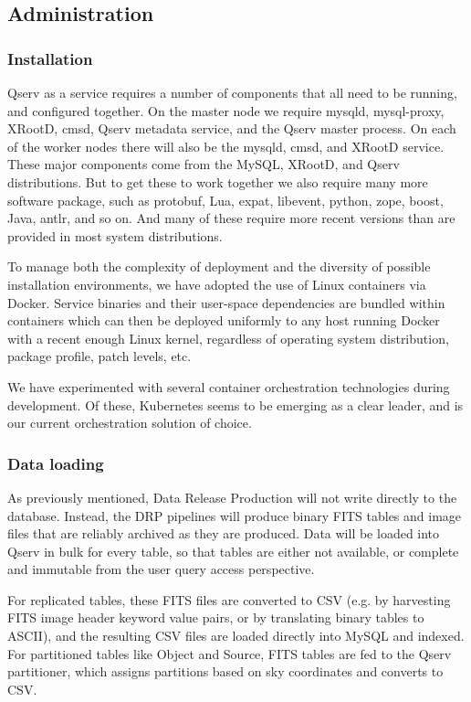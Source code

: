 \documentclass[DM,toc]{lsstdoc}
\begin{document}
\subsection{Administration}\label{administration}

\subsubsection{Installation}\label{installation}

Qserv as a service requires a number of components that all need to be
running, and configured together. On the master node we require mysqld, mysql-proxy,
XRootD, cmsd, Qserv metadata service, and the Qserv master process. On
each of the worker nodes there will also be the mysqld, cmsd, and XRootD
service. These major components come from the MySQL, XRootD, and Qserv
distributions. But to get these to work together we also require many more
software package, such as protobuf, Lua, expat, libevent, python, zope, boost,
Java, antlr, and so on. And many of these require more recent versions than
are provided in most system distributions.

To manage both the complexity of deployment and the diversity of possible
installation environments, we have adopted the use of Linux containers via
Docker.  Service binaries and their user-space dependencies are bundled within
containers which can then be deployed uniformly to any host running Docker
with a recent enough Linux kernel, regardless of operating system
distribution, package profile, patch levels, etc.

We have experimented with several container orchestration technologies
during development.  Of these, Kubernetes seems to be emerging as a clear
leader, and is our current orchestration solution of choice.

\subsubsection{Data loading}\label{data-loading}

As previously mentioned, Data Release Production will not write directly
to the database. Instead, the DRP pipelines will produce binary FITS
tables and image files that are reliably archived as they are produced.
Data will be loaded into Qserv in bulk for every table, so that tables
are either not available, or complete and immutable from the user query
access perspective.

For replicated tables, these FITS files are converted to CSV (e.g. by
harvesting FITS image header keyword value pairs, or by translating
binary tables to ASCII), and the resulting CSV files are loaded directly
into MySQL and indexed. For partitioned tables like Object and Source,
FITS tables are fed to the Qserv partitioner, which assigns partitions
based on sky coordinates and converts to CSV.
\end{document}
